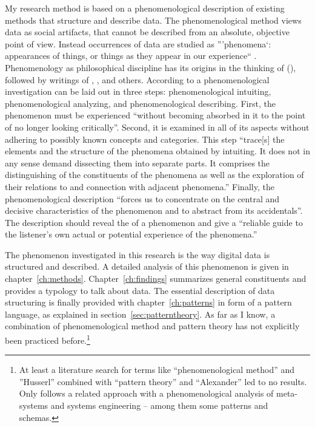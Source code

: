 My research method is based on a phenomenological description of existing
methods that structure and describe data. The phenomenological method views
data as social artifacts, that cannot be described from an absolute, objective
point of view. Instead occurrences of data are studied as '''phenomena`:
appearances of things, or things as they appear in our experience``
\cite{Smith2009}.  Phenomenology as philosophical discipline has its origins in
the thinking of  (\citeyear{Husserl1931,Husserl1986}),
followed by writings of ,
,  and others.
According to \textcite[681ff.]{Spiegelberg1982} a phenomenological
investigation can be laid out in three steps: phenomenological intuiting,
phenomenological analyzing, and phenomenological describing. First, the
phenomenon must be experienced ``without becoming absorbed in it to the point
of no longer looking critically''. Second, it is examined in all of its aspects
without adhering to possibly known concepts and categories. This step
``trace[s] the elements and the structure of the phenomena obtained by
intuiting. It does not in any sense demand dissecting them into separate parts.
It comprises the distinguishing of the constituents of the phenomena as well as
the exploration of their relations to and connection with adjacent phenomena.''
Finally, the phenomenological description ``forces us to concentrate on the
central and decisive characteristics of the phenomenon and to abstract from its
accidentals''. The description should reveal the  of a phenomenon
and give a ``reliable guide to the listener’s own actual or potential
experience of the phenomena.''


The phenomenon investigated in this research is the way digital data is
structured and described. A detailed analysis of this phenomenon is given in
chapter~\ref{ch:methods}.  Chapter~\ref{ch:findings} summarizes general
constituents and provides a typology to talk about data. The essential
description of data structuring is finally provided with
chapter~\ref{ch:patterns} in form of a pattern language, as explained in
section~\ref{sec:patterntheory}.  As far as I know, a combination of
phenomenological method and pattern theory has not explicitly been practiced
before.\footnote{At least a literature search for terms like ``phenomenological method''
and ''Husserl'' combined with ``pattern theory'' and ``Alexander'' led to no
results. Only \textcite{Palmer2009} follows a related approach with a
phenomenological analysis of meta-systems and systems engineering -- among 
them some patterns and schemas.}

